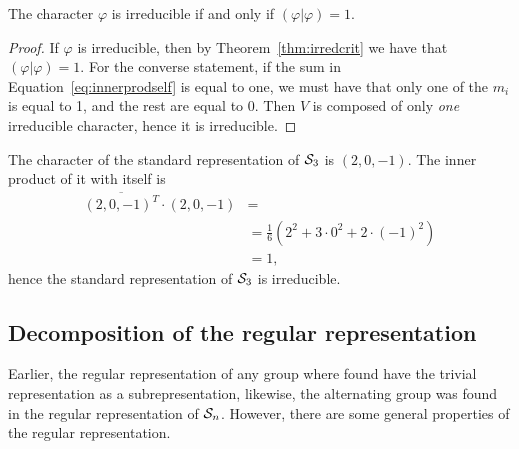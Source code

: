 \begin{theorem}
	The character $\varphi$ is irreducible if and only if $(\varphi|\varphi) = 1$.
\end{theorem}
\begin{proof}
	If $\varphi$ is irreducible, then by Theorem~\ref{thm:irredcrit} we have that $(\varphi|\varphi) = 1$. For the converse statement, if the sum in Equation~\ref{eq:innerprodself} is equal to one, we must have that only one of the $m_i$ is equal to 1, and the rest are equal to 0. Then $V$ is composed of only \textit{one} irreducible character, hence it is irreducible.
\end{proof}

\begin{example}
	The character of the standard representation of $\mathcal{S}_3$ is $(2,0,-1)$. The inner product of it with itself is
	\begin{align*}
		\overline{(2,0,-1)^T}\cdot (2,0,-1) &= \\
		&= \frac{1}{6}(2^2 + 3\cdot 0^2 + 2 \cdot (-1)^2)  \\
		&= 1,
	\end{align*}
	hence the standard representation of $\mathcal{S}_3$ is irreducible.
\end{example}



\subsection{Decomposition of the regular representation}
Earlier, the regular representation of any group where found have the trivial representation as a subrepresentation, likewise, the alternating group was found in the regular representation of $\mathcal{S}_n$. However, there are some general properties of the regular representation.

